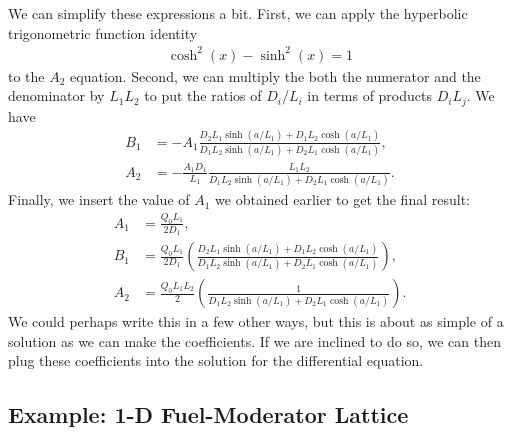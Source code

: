 We can simplify these expressions a bit. First, we can apply the hyperbolic trigonometric function identity
\begin{align}
  \cosh^2(x) - \sinh^2(x) = 1 \nonumber
\end{align}
to the $A_2$ equation. Second, we can multiply the both the numerator and the denominator by $L_1 L_2$ to put the ratios of $D_i/L_i$ in terms of products $D_i L_j$. We have
\begin{subequations}
\begin{align}
  B_1 &= -A_1 \frac{ D_2 L_1 \sinh(a/L_1) + D_1 L_2 \cosh(a/L_1) }{ D_1 L_2 \sinh(a/L_1) + D_2 L_1 \cosh(a/L_1) }, \\
  A_2 &= -\frac{A_1 D_1}{L_1} \frac{  L_1 L_2 }{ D_1 L_2 \sinh(a/L_1) + D_2 L_1 \cosh(a/L_1) } .
\end{align}
\end{subequations}
Finally, we insert the value of $A_1$ we obtained earlier to get the final result:
\begin{subequations}
\begin{align}
  A_1 &= \frac{ Q_0 L_1 }{ 2 D_1 }, \\
  B_1 &= \frac{ Q_0 L_1 }{ 2 D_1 } \left( \frac{ D_2 L_1 \sinh(a/L_1) + D_1 L_2 \cosh(a/L_1) }{ D_1 L_2 \sinh(a/L_1) + D_2 L_1 \cosh(a/L_1) } \right), \\
  A_2 &= \frac{ Q_0 L_1 L_2 }{ 2 } \left( \frac{  1 }{ D_1 L_2 \sinh(a/L_1) + D_2 L_1 \cosh(a/L_1) } \right) .
\end{align}
\end{subequations}
We could perhaps write this in a few other ways, but this is about as simple of a solution as we can make the coefficients. If we are inclined to do so, we can then plug these coefficients into the solution for the differential equation.

\subsection{Example: 1-D Fuel-Moderator Lattice}

